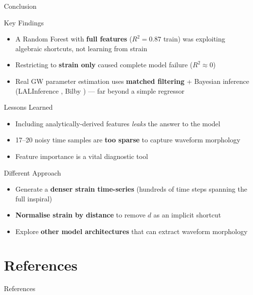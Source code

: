 \documentclass[aspectratio=169]{beamer}
\begin{document}
\begin{frame}{Conclusion}
  \begin{block}{Key Findings}
    \begin{itemize}
      \item A Random Forest with \textbf{full features} ($R^2 = 0.87$ train) was exploiting algebraic shortcuts, not learning from strain
      \item Restricting to \textbf{strain only} caused complete model failure ($R^2 \approx 0$)
      \item Real GW parameter estimation uses \textbf{matched filtering} + Bayesian inference (LALInference \parencite{Veitch2015}, Bilby \parencite{Ashton2019}) — far beyond a simple regressor
    \end{itemize}
  \end{block}
  \vspace{0.4em}
  \begin{block}{Lessons Learned}
    \begin{itemize}
      \item Including analytically-derived features \emph{leaks} the answer to the model
      \item 17–20 noisy time samples are \textbf{too sparse} to capture waveform morphology
      \item Feature importance is a vital diagnostic tool
    \end{itemize}
  \end{block}
\end{frame}

\begin{frame}{Different Approach}
  \begin{itemize}
    \item Generate a \textbf{denser strain time-series} (hundreds of time steps spanning the full inspiral)
    \vspace{0.4em}
    \item \textbf{Normalise strain by distance} to remove $d$ as an implicit shortcut
    \vspace{0.4em}
    \item Explore \textbf{other model architectures} that can extract waveform morphology
  \end{itemize}
\end{frame}

\section*{References}

\begin{frame}[allowframebreaks]{References}
  \printbibliography
\end{frame}
\end{document}
